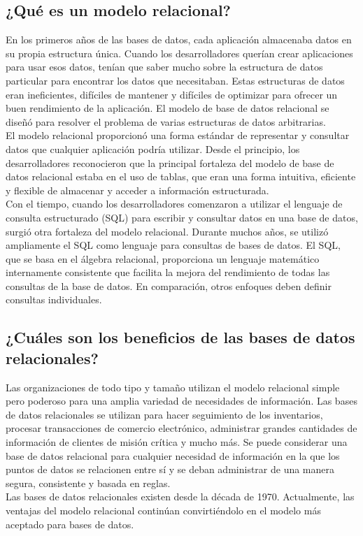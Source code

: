 \documentclass[12pt,letterpaper]{article}
\begin{document}
    \subsection{¿Qué es un modelo relacional?}
    En los primeros años de las bases de datos, cada aplicación almacenaba datos en su propia estructura única. Cuando los desarrolladores querían crear aplicaciones para usar esos datos, tenían que saber mucho sobre la estructura de datos particular para encontrar los datos que necesitaban. Estas estructuras de datos eran ineficientes, difíciles de mantener y difíciles de optimizar para ofrecer un buen rendimiento de la aplicación. El modelo de base de datos relacional se diseñó para resolver el problema de varias estructuras de datos arbitrarias.\\
    El modelo relacional proporcionó una forma estándar de representar y consultar datos que cualquier aplicación podría utilizar. Desde el principio, los desarrolladores reconocieron que la principal fortaleza del modelo de base de datos relacional estaba en el uso de tablas, que eran una forma intuitiva, eficiente y flexible de almacenar y acceder a información estructurada.\\
    Con el tiempo, cuando los desarrolladores comenzaron a utilizar el lenguaje de consulta estructurado (SQL) para escribir y consultar datos en una base de datos, surgió otra fortaleza del modelo relacional. Durante muchos años, se utilizó ampliamente el SQL como lenguaje para consultas de bases de datos. El SQL, que se basa en el álgebra relacional, proporciona un lenguaje matemático internamente consistente que facilita la mejora del rendimiento de todas las consultas de la base de datos. En comparación, otros enfoques deben definir consultas individuales.\\

    \subsection{¿Cuáles son los beneficios de las bases de datos relacionales?}
    Las organizaciones de todo tipo y tamaño utilizan el modelo relacional simple pero poderoso para una amplia variedad de necesidades de información. Las bases de datos relacionales se utilizan para hacer seguimiento de los inventarios, procesar transacciones de comercio electrónico, administrar grandes cantidades de información de clientes de misión crítica y mucho más. Se puede considerar una base de datos relacional para cualquier necesidad de información en la que los puntos de datos se relacionen entre sí y se deban administrar de una manera segura, consistente y basada en reglas.\\
    Las bases de datos relacionales existen desde la década de 1970. Actualmente, las ventajas del modelo relacional continúan convirtiéndolo en el modelo más aceptado para bases de datos.\\
    
\end{document}
